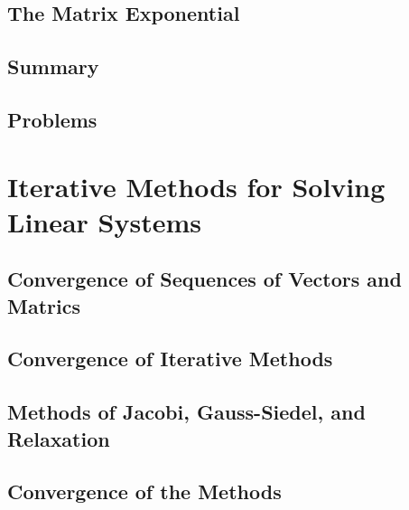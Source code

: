 \documentclass[a4paper]{article}
\begin{document}
\subsection{ The Matrix Exponential} %

\subsection{ Summary} %

\subsection{ Problems} %


\newpage
\section{Iterative Methods for Solving Linear Systems}
\subsection{ Convergence of Sequences of Vectors and Matrics} %

\subsection{ Convergence of Iterative Methods} %

\subsection{ Methods of Jacobi, Gauss-Siedel, and Relaxation} %

\subsection{ Convergence of the Methods} %
\end{document}
